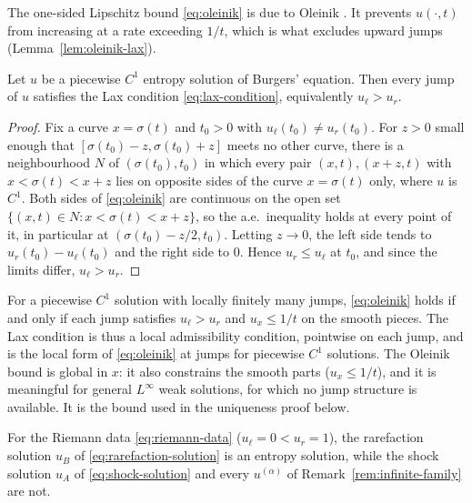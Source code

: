 The one-sided Lipschitz bound \eqref{eq:oleinik} is due to Oleinik
\cite{oleinik1957}. It prevents $u(\cdot,t)$ from increasing at a rate exceeding
$1/t$, which is what excludes upward jumps (Lemma~\ref{lem:oleinik-lax}).

\begin{lemma}
\label{lem:oleinik-lax}
Let $u$ be a piecewise $C^1$ entropy solution of Burgers' equation. Then
every jump of $u$ satisfies the Lax condition \eqref{eq:lax-condition},
equivalently $u_\ell>u_r$.
\end{lemma}

\begin{proof}
Fix a curve $x=\sigma(t)$ and $t_0>0$ with $u_\ell(t_0)\ne u_r(t_0)$. For $z>0$ small
enough that $[\sigma(t_0)-z,\sigma(t_0)+z]$ meets no other curve, there is a
neighbourhood $N$ of $(\sigma(t_0),t_0)$ in which every pair $(x,t),(x+z,t)$ with
$x<\sigma(t)<x+z$ lies on opposite sides of the curve $x=\sigma(t)$ only, where
$u$ is $C^1$. Both sides of \eqref{eq:oleinik} are continuous on the open set
$\{(x,t)\in N: x<\sigma(t)<x+z\}$, so the a.e.\ inequality holds at every point of
it, in particular at $(\sigma(t_0)-z/2,t_0)$. Letting $z\to0$, the left side
tends to $u_r(t_0)-u_\ell(t_0)$ and the right side to $0$. Hence $u_r\le u_\ell$ at
$t_0$, and since the limits differ, $u_\ell>u_r$.
\end{proof}

\begin{remark}
\label{rem:lax-vs-oleinik}
For a piecewise $C^1$ solution with locally finitely many jumps,
\eqref{eq:oleinik} holds if and only if each jump satisfies $u_\ell>u_r$ and
$u_x\le 1/t$ on the smooth pieces. The Lax condition is thus a local admissibility
condition, pointwise on each jump, and is the local form of \eqref{eq:oleinik}
at jumps for piecewise $C^1$ solutions. The Oleinik bound is global in $x$: it
also constrains the smooth parts ($u_x\le1/t$), and it is meaningful for general
$L^\infty$ weak solutions, for which no jump structure is available. It is the
bound used in the uniqueness proof below.
\end{remark}

\begin{proposition}
\label{prop:entropy-selects-B}
For the Riemann data \eqref{eq:riemann-data} ($u_\ell=0<u_r=1$), the
rarefaction solution $u_B$ of \eqref{eq:rarefaction-solution} is an
entropy solution, while the shock solution $u_A$ of
\eqref{eq:shock-solution} and every $u^{(\alpha)}$ of
Remark~\ref{rem:infinite-family} are not.
\end{proposition}

